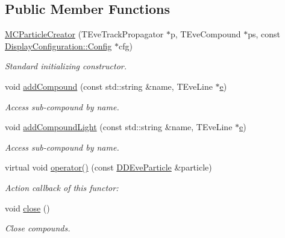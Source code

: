 \subsection*{Public Member Functions}
\begin{DoxyCompactItemize}
\item 
\hyperlink{struct_d_d4hep_1_1_m_c_particle_creator_a2fcb384a14cbc919c57f6774cf6c20f3}{M\+C\+Particle\+Creator} (T\+Eve\+Track\+Propagator $\ast$p, T\+Eve\+Compound $\ast$ps, const \hyperlink{class_d_d4hep_1_1_display_configuration_1_1_config}{Display\+Configuration\+::\+Config} $\ast$cfg)
\begin{DoxyCompactList}\small\item\em Standard initializing constructor. \end{DoxyCompactList}\item 
void \hyperlink{struct_d_d4hep_1_1_m_c_particle_creator_a282bb825147fa28733679bc6ed5a9afe}{add\+Compound} (const std\+::string \&name, T\+Eve\+Line $\ast$\hyperlink{_volumes_8cpp_a8a9a1f93e9b09afccaec215310e64142}{e})
\begin{DoxyCompactList}\small\item\em Access sub-\/compound by name. \end{DoxyCompactList}\item 
void \hyperlink{struct_d_d4hep_1_1_m_c_particle_creator_a7b64ce56bb99131d20afbccf27760828}{add\+Compound\+Light} (const std\+::string \&name, T\+Eve\+Line $\ast$\hyperlink{_volumes_8cpp_a8a9a1f93e9b09afccaec215310e64142}{e})
\begin{DoxyCompactList}\small\item\em Access sub-\/compound by name. \end{DoxyCompactList}\item 
virtual void \hyperlink{struct_d_d4hep_1_1_m_c_particle_creator_a42ebf0f3d55a5f02d9617ccf7aaf550a}{operator()} (const \hyperlink{class_d_d4hep_1_1_d_d_eve_particle}{D\+D\+Eve\+Particle} \&particle)
\begin{DoxyCompactList}\small\item\em Action callback of this functor\+: \end{DoxyCompactList}\item 
void \hyperlink{struct_d_d4hep_1_1_m_c_particle_creator_aa238c6f5a187841abb59e61db1c3ddf9}{close} ()
\begin{DoxyCompactList}\small\item\em Close compounds. \end{DoxyCompactList}\end{DoxyCompactItemize}

